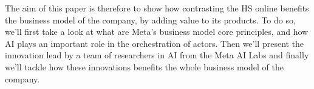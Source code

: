 
The aim of this paper is therefore to show how contrasting the HS
online benefits the business model of the company, by adding value to
its products. To do so, we'll first take a look at what are Meta's
business model core principles, and how AI plays an important role in
the orchestration of actors. Then we'll present the innovation lead by
a team of researchers in AI from the Meta AI Labs and finally we'll
tackle how these innovations benefits the whole business model of the
company.
